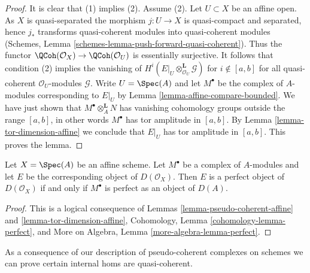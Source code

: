 \begin{proof}
It is clear that (1) implies (2). Assume (2). Let $U \subset X$ be
an affine open. As $X$ is quasi-separated the morphism $j : U \to X$
is quasi-compact and separated, hence $j_*$ transforms quasi-coherent
modules into quasi-coherent modules
(Schemes, Lemma \ref{schemes-lemma-push-forward-quasi-coherent}).
Thus the functor
$\QCoh(\mathcal{O}_X) \to \QCoh(\mathcal{O}_U)$
is essentially surjective. It follows that condition (2)
implies the vanishing of
$H^i(E|_U \otimes_{\mathcal{O}_U}^\mathbf{L} \mathcal{G})$
for $i \not \in [a, b]$ for all quasi-coherent $\mathcal{O}_U$-modules
$\mathcal{G}$. Write $U = \Spec(A)$ and let $M^\bullet$ be the
complex of $A$-modules corresponding to $E|_U$ by
Lemma \ref{lemma-affine-compare-bounded}.
We have just shown that $M^\bullet \otimes_A^\mathbf{L} N$
has vanishing cohomology groups outside the range $[a, b]$,
in other words $M^\bullet$ has tor amplitude in $[a, b]$.
By Lemma \ref{lemma-tor-dimension-affine}
we conclude that $E|_U$ has tor amplitude in $[a, b]$.
This proves the lemma.
\end{proof}

\begin{lemma}
\label{lemma-perfect-affine}
Let $X = \Spec(A)$ be an affine scheme. Let $M^\bullet$ be a
complex of $A$-modules and let $E$ be the corresponding object
of $D(\mathcal{O}_X)$. Then $E$ is a perfect object of $D(\mathcal{O}_X)$
if and only if $M^\bullet$ is perfect as an object of $D(A)$.
\end{lemma}

\begin{proof}
This is a logical consequence of
Lemmas \ref{lemma-pseudo-coherent-affine} and
\ref{lemma-tor-dimension-affine},
Cohomology, Lemma \ref{cohomology-lemma-perfect}, and
More on Algebra, Lemma \ref{more-algebra-lemma-perfect}.
\end{proof}

\noindent
As a consequence of our description of pseudo-coherent
complexes on schemes we can prove certain internal homs
are quasi-coherent.

